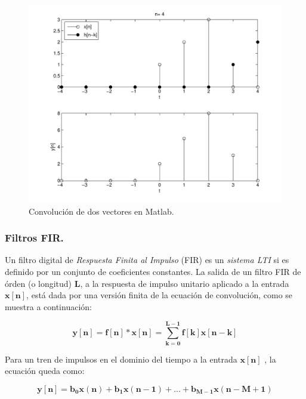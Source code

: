\begin{figure}[H]
\begin{centering}
\includegraphics[scale=0.6]{img/convolve}
\par\end{centering}
\caption{\label{fig:Convoluci=0000F3n-de-dos}Convoluci\'{o}n de dos vectores
en Matlab.}

\end{figure}


\subsubsection{Filtros FIR.}

Un filtro digital de \emph{Respuesta Finita al Impulso} (FIR) es un
\emph{sistema LTI} si es definido por un conjunto de coeficientes
constantes. La salida de un filtro FIR de \'{o}rden (o longitud) \textbf{L},
a la respuesta de impulso unitario aplicado a la entrada $\mathbf{x[n]}$,
est\'{a} dada por una versi\'{o}n finita de la ecuaci\'{o}n de convoluci\'{o}n,
como se muestra a continuaci\'{o}n:

\begin{equation}
\mathbf{y[n]=f[n]*x[n]=\sum_{k=0}^{L-1}f[k]x[n-k]}
\end{equation}

Para un tren de impulsos en el dominio del tiempo a la entrada $\mathbf{x[n]}$
, la ecuaci\'{o}n queda como:

\begin{equation}
\mathbf{y[n]=b_{0}x(n)+b_{1}x(n-1)+...+b_{M-1}x(n-M+1)}
\end{equation}

